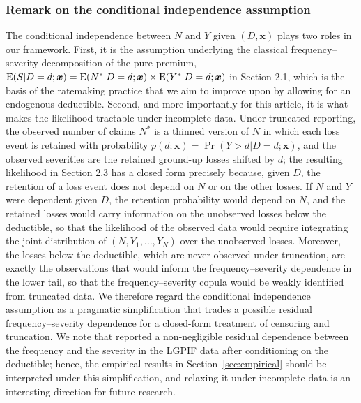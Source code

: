 \documentclass[11pt]{article}
\newcommand{\rev}[1]{{\color{blue}#1}}
\begin{document}
\subsubsection*{\rev{Remark on the conditional independence assumption}}\label{sec:condind}

\rev{The conditional independence between $N$ and $Y$ given $(D,\bm{x})$ plays two roles in our framework. First, it is the assumption underlying the classical frequency--severity decomposition of the pure premium, ${\rm E}(S|D=d;\bm{x})={\rm E}(N^*|D=d;\bm{x})\times{\rm E}(Y^*|D=d;\bm{x})$ in Section 2.1, which is the basis of the ratemaking practice that we aim to improve upon by allowing for an endogenous deductible. Second, and more importantly for this article, it is what makes the likelihood tractable under incomplete data. Under truncated reporting, the observed number of claims $N^*$ is a thinned version of $N$ in which each loss event is retained with probability $p(d;\bm{x})=\Pr(Y>d|D=d;\bm{x})$, and the observed severities are the retained ground-up losses shifted by $d$; the resulting likelihood in Section 2.3 has a closed form precisely because, given $D$, the retention of a loss event does not depend on $N$ or on the other losses. If $N$ and $Y$ were dependent given $D$, the retention probability would depend on $N$, and the retained losses would carry information on the unobserved losses below the deductible, so that the likelihood of the observed data would require integrating the joint distribution of $(N,Y_1,\ldots,Y_{N})$ over the unobserved losses. Moreover, the losses below the deductible, which are never observed under truncation, are exactly the observations that would inform the frequency--severity dependence in the lower tail, so that the frequency--severity copula would be weakly identified from truncated data. We therefore regard the conditional independence assumption as a pragmatic simplification that trades a possible residual frequency--severity dependence for a closed-form treatment of censoring and truncation. We note that \citet{shi2022copula} reported a non-negligible residual dependence between the frequency and the severity in the LGPIF data after conditioning on the deductible; hence, the empirical results in Section~\ref{sec:empirical} should be interpreted under this simplification, and relaxing it under incomplete data is an interesting direction for future research.} %
\end{document}
